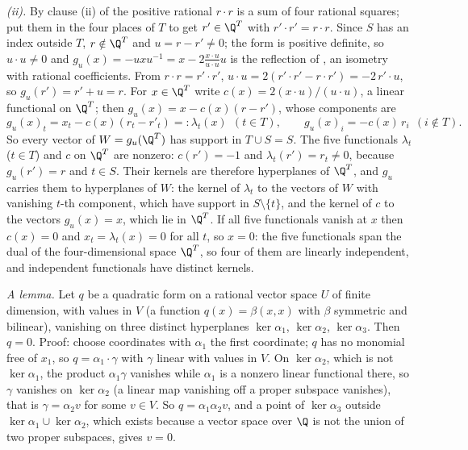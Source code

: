 \emph{(ii).} By clause (ii) of  the positive rational $r \cdot r$ is a sum of four rational squares; put them in the four places of $T$ to get $r' \in \Q^{T}$ with $r' \cdot r' = r \cdot r$. Since $S$ has an index outside $T$, $r \notin \Q^{T}$ and $u = r - r' \ne 0$; the form is positive definite, so $u \cdot u \ne 0$ and $g_{u}(x) = -uxu^{-1} = x - 2\tfrac{x \cdot u}{u \cdot u}u$ is the reflection of , an isometry with rational coefficients. From $r \cdot r = r' \cdot r'$, $u \cdot u = 2(r' \cdot r' - r \cdot r') = -2\,r' \cdot u$, so $g_{u}(r') = r' + u = r$. For $x \in \Q^{T}$ write $c(x) = 2(x \cdot u)/(u \cdot u)$, a linear functional on $\Q^{T}$; then $g_{u}(x) = x - c(x)(r - r')$, whose components are
\[
g_{u}(x)_{t} = x_{t} - c(x)(r_{t} - r'_{t}) =: \lambda_{t}(x) \ \ (t \in T), \qquad g_{u}(x)_{i} = -c(x)\,r_{i} \ \ (i \notin T).
\]
So every vector of $W = g_{u}(\Q^{T})$ has support in $T \cup S = S$. The five functionals $\lambda_{t}$ ($t \in T$) and $c$ on $\Q^{T}$ are nonzero: $c(r') = -1$ and $\lambda_{t}(r') = r_{t} \ne 0$, because $g_{u}(r') = r$ and $t \in S$. Their kernels are therefore hyperplanes of $\Q^{T}$, and $g_{u}$ carries them to hyperplanes of $W$: the kernel of $\lambda_{t}$ to the vectors of $W$ with vanishing $t$-th component, which have support in $S \setminus \{t\}$, and the kernel of $c$ to the vectors $g_{u}(x) = x$, which lie in $\Q^{T}$. If all five functionals vanish at $x$ then $c(x) = 0$ and $x_{t} = \lambda_{t}(x) = 0$ for all $t$, so $x = 0$: the five functionals span the dual of the four-dimensional space $\Q^{T}$, so four of them are linearly independent, and independent functionals have distinct kernels.

\emph{A lemma.} Let $q$ be a quadratic form on a rational vector space $U$ of finite dimension, with values in $V$ (a function $q(x) = \beta(x,x)$ with $\beta$ symmetric and bilinear), vanishing on three distinct hyperplanes $\ker\alpha_{1}$, $\ker\alpha_{2}$, $\ker\alpha_{3}$. Then $q = 0$. Proof: choose coordinates with $\alpha_{1}$ the first coordinate; $q$ has no monomial free of $x_{1}$, so $q = \alpha_{1}\cdot\gamma$ with $\gamma$ linear with values in $V$. On $\ker\alpha_{2}$, which is not $\ker\alpha_{1}$, the product $\alpha_{1}\gamma$ vanishes while $\alpha_{1}$ is a nonzero linear functional there, so $\gamma$ vanishes on $\ker\alpha_{2}$ (a linear map vanishing off a proper subspace vanishes), that is $\gamma = \alpha_{2}v$ for some $v \in V$. So $q = \alpha_{1}\alpha_{2}v$, and a point of $\ker\alpha_{3}$ outside $\ker\alpha_{1} \cup \ker\alpha_{2}$, which exists because a vector space over $\Q$ is not the union of two proper subspaces, gives $v = 0$.

